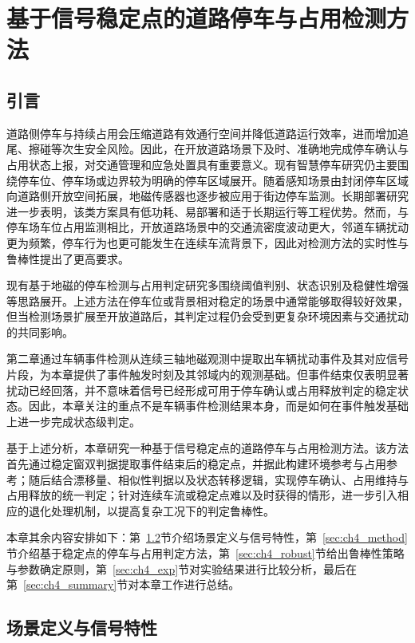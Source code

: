 \documentclass{xdupgthesis}
\begin{document}
\chapter{基于信号稳定点的道路停车与占用检测方法}
\label{ch:ch4_parking}

\section{引言}
\label{sec:ch4_intro}

道路侧停车与持续占用会压缩道路有效通行空间并降低道路运行效率，进而增加追尾、擦碰等次生安全风险。因此，在开放道路场景下及时、准确地完成停车确认与占用状态上报，对交通管理和应急处置具有重要意义。现有智慧停车研究仍主要围绕停车位、停车场或边界较为明确的停车区域展开\cite{diazogas2020spsurvey}。随着感知场景由封闭停车区域向道路侧开放空间拓展，地磁传感器也逐步被应用于街边停车监测\cite{ch4_gu2013streetparking}。长期部署研究进一步表明，该类方案具有低功耗、易部署和适于长期运行等工程优势\cite{ch4_huang2017easydeploy}。然而，与停车场车位占用监测相比，开放道路场景中的交通流密度波动更大，邻道车辆扰动更为频繁，停车行为也更可能发生在连续车流背景下，因此对检测方法的实时性与鲁棒性提出了更高要求。

现有基于地磁的停车检测与占用判定研究多围绕阈值判别、状态识别及稳健性增强等思路展开\cite{R52}。上述方法在停车位或背景相对稳定的场景中通常能够取得较好效果，但当检测场景扩展至开放道路后，其判定过程仍会受到更复杂环境因素与交通扰动的共同影响。

第二章通过车辆事件检测从连续三轴地磁观测中提取出车辆扰动事件及其对应信号片段，为本章提供了事件触发时刻及其邻域内的观测基础。但事件结束仅表明显著扰动已经回落，并不意味着信号已经形成可用于停车确认或占用释放判定的稳定状态。因此，本章关注的重点不是车辆事件检测结果本身，而是如何在事件触发基础上进一步完成状态级判定。

基于上述分析，本章研究一种基于信号稳定点的道路停车与占用检测方法。该方法首先通过稳定窗双判据提取事件结束后的稳定点，并据此构建环境参考与占用参考；随后结合漂移量、相似性判据以及状态转移逻辑，实现停车确认、占用维持与占用释放的统一判定；针对连续车流或稳定点难以及时获得的情形，进一步引入相应的退化处理机制，以提高复杂工况下的判定鲁棒性。

本章其余内容安排如下：第~\ref{sec:ch4_problem}节介绍场景定义与信号特性，第~\ref{sec:ch4_method}节介绍基于稳定点的停车与占用判定方法，第~\ref{sec:ch4_robust}节给出鲁棒性策略与参数确定原则，第~\ref{sec:ch4_exp}节对实验结果进行比较分析，最后在第~\ref{sec:ch4_summary}节对本章工作进行总结。


\section{场景定义与信号特性}
\label{sec:ch4_problem}
\end{document}
